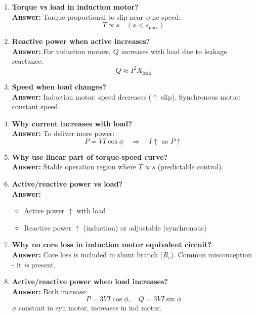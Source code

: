 \documentclass[12pt,a4paper]{article}
\begin{document}
\begin{enumerate}
		\item \textbf{Torque vs load in induction motor?} \\
		\textbf{Answer:} Torque proportional to slip near sync speed:
		\[
		T \propto s \quad (s < s_{\text{max}})
		\]
		
		\item \textbf{Reactive power when active increases?} \\
		\textbf{Answer:} For induction motors, $Q$ increases with load due to leakage reactance:
		\[
		Q \approx I^2X_{\text{leak}}
		\]
		
		\item \textbf{Speed when load changes?} \\
		\textbf{Answer:} Induction motor: speed decreases ($\uparrow$ slip). Synchronous motor: constant speed.
		
		\item \textbf{Why current increases with load?} \\
		\textbf{Answer:} To deliver more power:
		\[
		P = VI\cos\phi \quad \Rightarrow \quad I \uparrow \text{ as } P \uparrow
		\]
		
		\item \textbf{Why use linear part of torque-speed curve?} \\
		\textbf{Answer:} Stable operation region where $T \propto s$ (predictable control).
		
		\item \textbf{Active/reactive power vs load?} \\
		\textbf{Answer:} 
		\begin{itemize}
			\item Active power $\uparrow$ with load
			\item Reactive power $\uparrow$ (induction) or adjustable (synchronous)
		\end{itemize}
		
		\item \textbf{Why no core loss in induction motor equivalent circuit?} \\
		\textbf{Answer:} Core loss is included in shunt branch ($R_c$). Common misconception - it \textit{is} present.
		
		\item \textbf{Active/reactive power when load increases?} \\
		\textbf{Answer:} Both increase:
		\[
		P = 3VI\cos\phi, \quad Q = 3VI\sin\phi
		\]
		$\phi$ constant in syn motor, increases in ind motor.
		

\end{enumerate}
\end{document}
